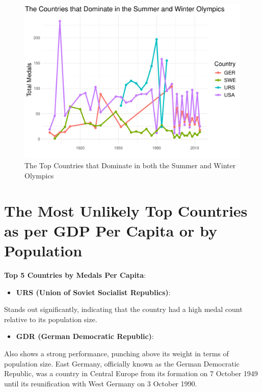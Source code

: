 \documentclass[
  12pt,
]{elsarticle}
\providecommand{\tightlist}{%
  \setlength{\itemsep}{0pt}\setlength{\parskip}{0pt}}
\begin{document}
\begin{figure}

{\centering \includegraphics{README_files/figure-latex/unnamed-chunk-1-1} 

}

\caption{The Top Countries that Dominate in both the Summer and Winter Olympics\label{Figure1}}\label{fig:unnamed-chunk-1}
\end{figure}

\hypertarget{the-most-unlikely-top-countries-as-per-gdp-per-capita-or-by-population}{%
\section{The Most Unlikely Top Countries as per GDP Per Capita or by
Population}\label{the-most-unlikely-top-countries-as-per-gdp-per-capita-or-by-population}}

\textbf{Top 5 Countries by Medals Per Capita}:

\begin{itemize}
\tightlist
\item
  \textbf{URS (Union of Soviet Socialist Republics)}:
\end{itemize}

Stands out significantly, indicating that the country had a high medal
count relative to its population size.

\begin{itemize}
\tightlist
\item
  \textbf{GDR (German Democratic Republic)}:
\end{itemize}

Also shows a strong performance, punching above its weight in terms of
population size. East Germany, officially known as the German Democratic
Republic, was a country in Central Europe from its formation on 7
October 1949 until its reunification with West Germany on 3 October
1990.
\end{document}
